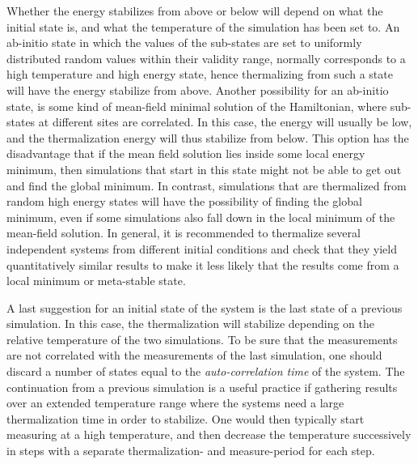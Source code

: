 Whether the energy stabilizes from above or below will depend
on what the initial state is, and what the temperature of the simulation has been set to. An ab-initio state in which the values of the sub-states
are set to uniformly distributed random values within their validity range, normally corresponds to a high temperature and
high energy state, hence thermalizing from such a state will have the energy stabilize from above. Another possibility for an ab-initio
state, is some kind of mean-field minimal solution of the Hamiltonian, where sub-states at different sites are correlated. In this case, the
energy will usually be low, and the thermalization energy will thus stabilize from below. This option has the disadvantage that if the mean field
solution lies inside some local energy minimum, then simulations that start in this state might not be able to get out and find the global minimum.
In contrast, simulations that are thermalized from random high energy states will have the possibility of finding the global minimum, even
if some simulations also fall down in the local minimum of the mean-field solution.
In general, it is recommended to thermalize several independent systems from different initial conditions and check that they yield quantitatively similar results
to make it less likely that the results come from a local minimum or meta-stable state.

A last suggestion for an initial state of the system
is the last state of a previous simulation. In this case, the thermalization will stabilize depending on the relative temperature
of the two simulations. To be sure that the measurements are not correlated with the measurements of the last simulation, one should discard
a number of states equal to the \emph{auto-correlation time} of the system.
The continuation from a previous simulation is a useful practice if gathering results over an extended temperature range where the systems need a large
thermalization time in order to stabilize. One would then typically start measuring at a high temperature, and then decrease the temperature
successively in steps with a separate thermalization- and measure-period for each step.

